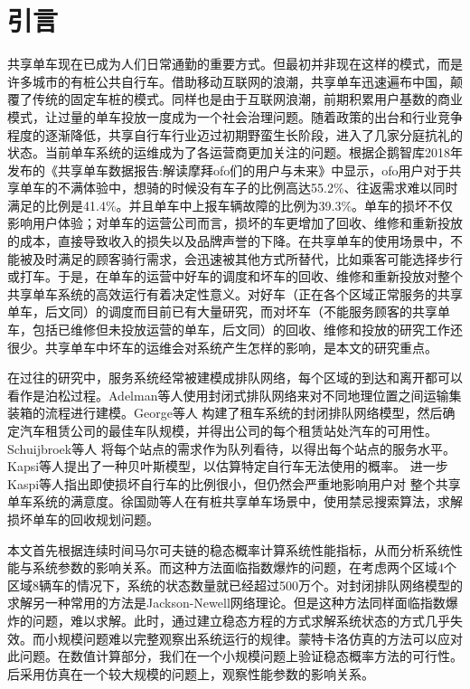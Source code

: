 \documentclass{article}
\begin{document}
\section{引言}
共享单车现在已成为人们日常通勤的重要方式。但最初并非现在这样的模式，而是许多城市的有桩公共自行车。借助移动互联网的浪潮，共享单车迅速遍布中国，颠覆了传统的固定车桩的模式。同样也是由于互联网浪潮，前期积累用户基数的商业模式，让过量的单车投放一度成为一个社会治理问题。随着政策的出台和行业竞争程度的逐渐降低，共享自行车行业迈过初期野蛮生长阶段，进入了几家分庭抗礼的状态。当前单车系统的运维成为了各运营商更加关注的问题。根据企鹅智库2018年发布的《共享单车数据报告:解读摩拜ofo们的用户与未来》中显示，ofo用户对于共享单车的不满体验中，想骑的时候没有车子的比例高达55.2\%、往返需求难以同时满足的比例是41.4\%。并且单车中上报车辆故障的比例为39.3\%。单车的损坏不仅影响用户体验；对单车的运营公司而言，损坏的车更增加了回收、维修和重新投放的成本，直接导致收入的损失以及品牌声誉的下降。在共享单车的使用场景中，不能被及时满足的顾客骑行需求，会迅速被其他方式所替代，比如乘客可能选择步行或打车。于是，在单车的运营中好车的调度和坏车的回收、维修和重新投放对整个共享单车系统的高效运行有着决定性意义。对好车（正在各个区域正常服务的共享单车，后文同）的调度而目前已有大量研究，而对坏车（不能服务顾客的共享单车，包括已维修但未投放运营的单车，后文同）的回收、维修和投放的研究工作还很少。共享单车中坏车的运维会对系统产生怎样的影响，是本文的研究重点。

在过往的研究中，服务系统经常被建模成排队网络，每个区域的到达和离开都可以看作是泊松过程。Adelman等人\cite{adelman2007price}使用封闭式排队网络来对不同地理位置之间运输集装箱的流程进行建模。George等人\cite{george2011fleet} 构建了租车系统的封闭排队网络模型，然后确定汽车租赁公司的最佳车队规模，并得出公司的每个租赁站处汽车的可用性。 Schuijbroek等人\cite{Schuijbroek2017Inventory} 将每个站点的需求作为队列看待，以得出每个站点的服务水平。Kapsi等人\cite{KaspiDetection}提出了一种贝叶斯模型，以估算特定自行车无法使用的概率。 进一步Kaspi等人\cite{Kaspi2017Bike}指出即使损坏自行车的比例很小，但仍然会严重地影响用户对 整个共享单车系统的满意度。徐国勋等人\cite{徐国勋2019考虑损坏自行车回收的共享单车调度问题}在有桩共享单车场景中，使用禁忌搜索算法，求解损坏单车的回收规划问题。

本文首先根据连续时间马尔可夫链的稳态概率计算系统性能指标，从而分析系统性能与系统参数的影响关系。而这种方法面临指数爆炸的问题，在考虑两个区域4个区域8辆车的情况下，系统的状态数量就已经超过500万个。对封闭排队网络模型的求解另一种常用的方法是Jackson-Newell网络理论。但是这种方法同样面临指数爆炸的问题，难以求解。此时，通过建立稳态方程的方式求解系统状态的方式几乎失效。而小规模问题难以完整观察出系统运行的规律。蒙特卡洛仿真的方法可以应对此问题。在数值计算部分，我们在一个小规模问题上验证稳态概率方法的可行性。后采用仿真在一个较大规模的问题上，观察性能参数的影响关系。
\end{document}
